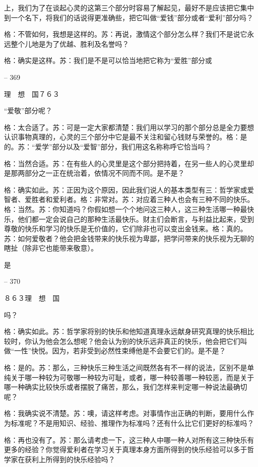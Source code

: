 \documentclass[11pt,oneside]{book}
\begin{document}
\begin{common-format}
    上，我们为了在谈起心灵的这第三个部分时容易了解起见，最好不是应该把它集中到一个名下，将我们的话说得更准确些，把它叫做“爱钱”部分或者“爱利”部分吗？

    格：不管如何，我想是这样的。苏：再说，激情这个部分怎么样？我们不是说它永远整个儿地是为了优越、胜利及名誉吗？

    格：确实是这样。苏：我们是不是可以恰当地把它称为“爱胜”部分或

    

-- 369

    理　想　国７６３

    “爱敬”部分呢？

    格：太合适了。苏：可是一定大家都清楚：我们用以学习的那个部分总是全力要想认识事物真理的，心灵的三个部分中它是最不关注和留心钱财与荣誉的。格：是的。苏：“爱学”部分以及“爱智”部分，我们用这名称称呼它恰当吗？

    格：当然合适。苏：在有些人的心灵里是这个部分把持着，在另一些人的心灵里却是那两部分之一正在统治着，依情况不同而不同。是不是？

    格：确实如此。苏：正因为这个原因，因此我们说人的基本类型有三：哲学家或爱智者、爱胜者和爱利者。格：非常对。苏：对应着三种人也会有三种不同的快乐。格：当然。苏：你知道吗？你假如想一个个地问这三种人，这三种生活哪一种最快乐，他们都一定会说自己的那种生活最快乐。财主们会断言，与利益比起来，受到尊敬的快乐和学习的快乐是无价值的，它们除非也可以变出金钱来。格：真的。苏：如何爱敬者？他会把金钱带来的快乐视为卑鄙，把学问带来的快乐视为无聊的瞎扯（除非它也能带来敬意）。

    是

    

-- 370

    ８６３理　想　国

    吗？

    格：确实如此。苏：哲学家将别的快乐和他知道真理永远献身研究真理的快乐相比较时，你认为他会怎么想呢？他会认为别的快乐远非真正的快乐，他会把它们叫做“一性”快悦。因为，若非受到必然性束缚他是不会要它们的。是不是？

    格：是的。苏：那么，三种快乐三种生活之间既然各有不一样的说法，区别不是单纯关于哪一种较为可敬哪一种较为可耻，或者，哪一种较善哪一种较恶，而是关于哪一种确实比较快乐或者摆脱了痛苦，那么，我们怎样来判定哪一种说法最确切呢？

    格：我确实说不清楚。苏：噢，请这样考虑。对事情作出正确的判断，要用什么作为标准呢？不是用知识、经验、推理作为标准吗？还有什么比它们更好的标准吗？

    格：再也没有了。苏：那么请考虑一下，这三种人中哪一种人对所有这三种快乐有更多的经验？你觉得爱利者在学习关于真理本身方面所得到的快乐经验可以多于哲学家在获利上所得到的快乐经验吗？


\end{common-format}
\end{document}
